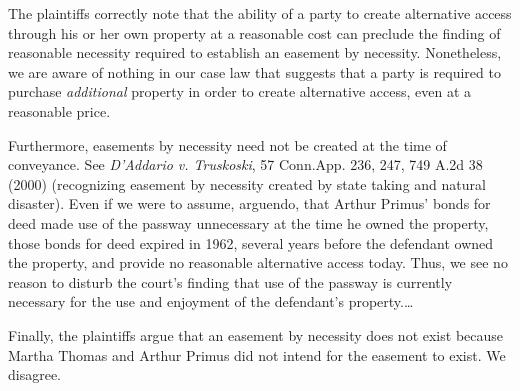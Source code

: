 The plaintiffs correctly note that the ability of a party to create alternative
access through his or her own property at a reasonable cost can preclude the
finding of reasonable necessity required to establish an easement by necessity.
Nonetheless, we are aware of nothing in our case law that suggests that a party
is required to purchase \textit{additional} property in order to create
alternative access, even at a reasonable price.

Furthermore, easements by necessity need not be created at the time of
conveyance. See \textit{D'Addario v. Truskoski},  57 Conn.App. 236, 247, 749
A.2d 38 (2000) (recognizing easement by necessity created by state taking and
natural disaster). Even if we were to assume, arguendo, that Arthur Primus'
bonds for deed made use of the passway unnecessary at the time he owned the
property, those bonds for deed expired in 1962, several years before the
defendant owned the property, and provide no reasonable alternative access
today. Thus, we see no reason to disturb the court's finding that use of the
passway is currently necessary for the use and enjoyment of the defendant's
property.\ldots


Finally, the plaintiffs argue that an easement by necessity does not exist
because Martha Thomas and Arthur Primus did not intend for the easement to
exist. We disagree.


